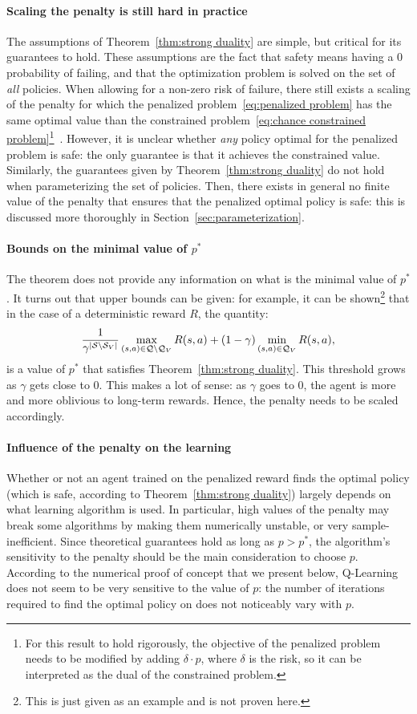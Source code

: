 \paragraph{Scaling the penalty is still hard in practice} The assumptions of Theorem~\ref{thm:strong duality} are simple, but critical for its guarantees to hold. These assumptions are the fact that safety means having a $0$ probability of failing, and that the optimization problem is solved on the set of\emph{ all} policies. When allowing for a non-zero risk of failure, there still exists a scaling of the penalty for which the penalized problem~\eqref{eq:penalized problem} has the same optimal value than the constrained problem~\eqref{eq:chance constrained problem}\footnote{For this result to hold rigorously, the objective of the penalized problem needs to be modified by adding $\delta\cdot p$, where $\delta$ is the risk, so it can be interpreted as the dual of the constrained problem.}~\cite{paternain2019safe}. However, it is unclear whether\emph{ any} policy optimal for the penalized problem is safe: the only guarantee is that it achieves the constrained value. Similarly, the guarantees given by Theorem~\ref{thm:strong duality} do not hold when parameterizing the set of policies. Then, there exists in general no finite value of the penalty that ensures that the penalized optimal policy is safe: this is discussed more thoroughly in Section~\ref{sec:parameterization}.
\paragraph{Bounds on the minimal value of $p^*$} \label{sec:gamma p trade off} The theorem does not provide any information on what is the minimal value of $p^*$. It turns out that upper bounds can be given: for example, it can be shown\footnote{This is just given as an example and is not proven here.} that in the case of a deterministic reward $R$, the quantity: 
$$
	\frac{1}{\gamma^{|\mathcal{S}\setminus{\ensuremath{\mathcal{S}}_{V}}|}}\max_{(s,a)\in\mathcal{Q}\setminus\mathcal{Q}_{V}}R(s, a) + (1 - \gamma)\min_{(s, a)\in\mathcal{Q}_{V}}R(s, a),
$$
is a value of $p^*$ that satisfies Theorem~\ref{thm:strong duality}. This threshold grows as $\gamma$ gets close to $0$. This makes a lot of sense: as $\gamma$ goes to $0$, the agent is more and more oblivious to long-term rewards. Hence, the penalty needs to be scaled accordingly.

\paragraph{Influence of the penalty on the learning} Whether or not an agent trained on the penalized reward finds the optimal policy (which is safe, according to Theorem~\ref{thm:strong duality}) largely depends on what learning algorithm is used. In particular, high values of the penalty may break some algorithms by making them numerically unstable, or very sample-inefficient. Since theoretical guarantees hold as long as $p > p^*$, the algorithm's sensitivity to the penalty should be the main consideration to choose $p$. According to the numerical proof of concept that we present below, Q-Learning does not seem to be very sensitive to the value of $p$: the number of iterations required to find the optimal policy on does not noticeably vary with $p$.

